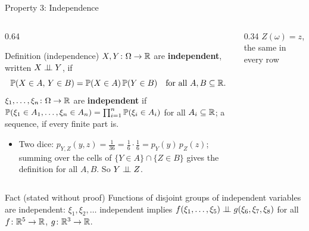 \begin{frame}{Property 3: Independence}
  \small
  \begin{columns}[T]
    \begin{column}{0.64\textwidth}
      \begin{block}{Definition (independence)}
        $X,Y\colon\Omega\to\mathbb{R}$ are \textbf{independent}, written $X\perp\!\!\!\perp Y$, if
        \[
          \mathbb{P}(X\in A,\,Y\in B)=\mathbb{P}(X\in A)\,\mathbb{P}(Y\in B)\quad\text{for all }A,B\subseteq\mathbb{R} .
        \]
        $\xi_1,\dots,\xi_n\colon\Omega\to\mathbb{R}$ are \textbf{independent} if
        $\mathbb{P}(\xi_1\in A_1,\dots,\xi_n\in A_n)=\prod_{i=1}^n\mathbb{P}(\xi_i\in A_i)$ for all $A_i\subseteq\mathbb{R}$; a sequence, if every finite part is.
      \end{block}
      \begin{itemize}
        \item Two dice: $p_{Y,Z}(y,z)=\tfrac1{36}=\tfrac16\cdot\tfrac16=p_Y(y)\,p_Z(z)$; summing over the cells of $\{Y\in A\}\cap\{Z\in B\}$ gives the definition for all $A,B$. So $Y\perp\!\!\!\perp Z$.
      \end{itemize}
    \end{column}
    \begin{column}{0.34\textwidth}
      \centering
      $Z(\omega)=z$, the same in every row\par\medskip
    \end{column}
  \end{columns}
  \begin{block}{Fact (stated without proof)}
    Functions of disjoint groups of independent variables are independent: $\xi_1,\xi_2,\dots$ independent implies $f(\xi_1,\dots,\xi_5)\perp\!\!\!\perp g(\xi_6,\xi_7,\xi_8)$ for all $f\colon\mathbb{R}^5\to\mathbb{R}$, $g\colon\mathbb{R}^3\to\mathbb{R}$.
  \end{block}
\end{frame}


